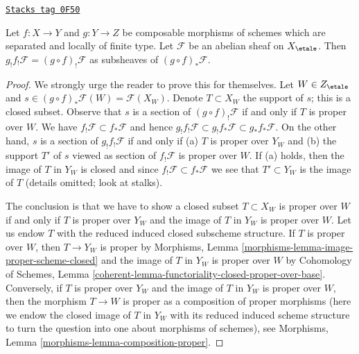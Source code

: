 \begin{lemma}
\label{more-etale-lemma-f-shriek-composition}
\href{https://stacks.math.columbia.edu/tag/0F50}{\texttt{Stacks tag 0F50}}

Let $f : X \to Y$ and $g : Y \to Z$ be composable morphisms of schemes which
are separated and locally of finite type. Let $\mathcal{F}$ be an abelian
sheaf on $X_\etale$. Then $g_!f_!\mathcal{F} = (g \circ f)_!\mathcal{F}$
as subsheaves of $(g \circ f)_*\mathcal{F}$.
\end{lemma}

\begin{proof}
We strongly urge the reader to prove this for themselves.
Let $W \in Z_\etale$ and
$s \in (g \circ f)_*\mathcal{F}(W) = \mathcal{F}(X_W)$.
Denote $T \subset X_W$ the support of $s$; this is a closed
subset. Observe that $s$ is a section of $(g \circ f)_!\mathcal{F}$
if and only if $T$ is proper over $W$. We have
$f_!\mathcal{F} \subset f_*\mathcal{F}$ and hence
$g_!f_!\mathcal{F} \subset g_!f_*\mathcal{F} \subset g_*f_*\mathcal{F}$.
On the other hand, $s$ is a section of $g_!f_!\mathcal{F}$ if and only
if (a) $T$ is proper over $Y_W$ and (b) the support $T'$ of $s$
viewed as section of $f_!\mathcal{F}$ is proper over $W$.
If (a) holds, then the image of $T$ in $Y_W$ is closed and since
$f_!\mathcal{F} \subset f_*\mathcal{F}$ we see that
$T' \subset Y_W$ is the image of $T$ (details omitted; look at stalks).

\medskip\noindent
The conclusion is that we have to show a closed subset $T \subset X_W$
is proper over $W$ if and only if $T$ is proper over $Y_W$
and the image of $T$ in $Y_W$ is proper over $W$. Let us endow $T$
with the reduced induced closed subscheme structure.
If $T$ is proper over $W$, then $T \to Y_W$ is proper by
Morphisms, Lemma \ref{morphisms-lemma-image-proper-scheme-closed}
and the image of $T$ in $Y_W$ is proper over $W$ by
Cohomology of Schemes, Lemma
\ref{coherent-lemma-functoriality-closed-proper-over-base}.
Conversely, if $T$ is proper over $Y_W$
and the image of $T$ in $Y_W$ is proper over $W$,
then the morphism $T \to W$ is proper as a composition
of proper morphisms (here we endow the closed image of $T$
in $Y_W$ with its reduced induced scheme structure to turn the
question into one about morphisms of schemes), see
Morphisms, Lemma \ref{morphisms-lemma-composition-proper}.
\end{proof}

